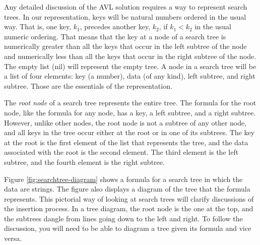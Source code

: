 Any detailed discussion of the AVL solution requires
a way to represent search trees.
In our representation,
\label{key-representation}keys will be natural numbers
ordered in the usual way.
That is, one key, $k_1$, precedes another key, $k_2$,
if $k_1 < k_2$ in the usual numeric ordering.
That means that the key at a node of a search tree
is numerically greater than all the keys that occur in
the left subtree of the node
and numerically less than
all the keys that occur in the right subtree of the node.
\label{empty-tree-representation}The empty list (\textsf{nil}) will represent the
empty tree.
\label{node-representation}A node
in a search tree will be a list of four elements:
key (a number),
data (of any kind), left subtree, and right subtree.
Those are the essentials of the representation.

\label{root-node-def}
The
\emph{root node}
of a search tree represents the entire tree.
The formula for the root node, like the formula for any node,
has a key, a left subtree, and a right subtree.
However, unlike other nodes, the root node is not a subtree
of any other node, and all keys in the tree occur
either at the root or in one of its subtrees.
The key at the root is the first element of the list that represents the tree,
and the data associated with the root is the second element.
 \label{left-subtree-def}The third element
is the left subtree,
\label{right-subtree-def}and the fourth element is the right subtree.

Figure \ref{fig:searchtree-diagram} shows a formula
for a search tree in which the data are strings.
The figure also displays a diagram of the tree
that the formula represents.
This pictorial way of looking at search trees
will clarify discussions of the insertion process.
In a tree diagram, the root node is the one at the top,
and the subtrees dangle from lines going down to
the left and right.
To follow the discussion,
you will need to be able to diagram a tree
given its formula and vice versa.

